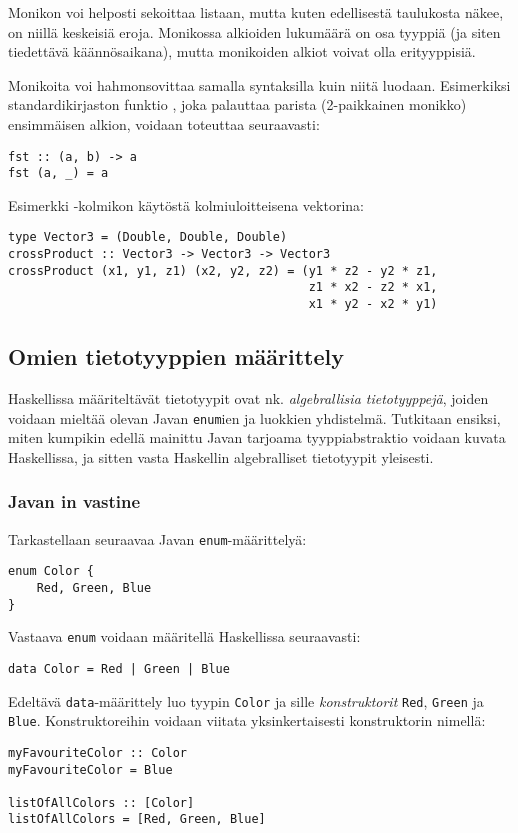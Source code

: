 Monikon voi helposti sekoittaa listaan,
mutta kuten edellisestä taulukosta näkee,
on niillä keskeisiä eroja.
Monikossa alkioiden lukumäärä on osa tyyppiä (ja siten tiedettävä käännösaikana),
mutta monikoiden alkiot voivat olla erityyppisiä.

Monikoita voi hahmonsovittaa samalla syntaksilla kuin niitä luodaan.
Esimerkiksi standardikirjaston funktio ,
joka palauttaa parista (2-paikkainen monikko) ensimmäisen alkion,
voidaan toteuttaa seuraavasti:
\begin{verbatim}
fst :: (a, b) -> a
fst (a, _) = a
\end{verbatim}
Esimerkki -kolmikon käytöstä kolmiuloitteisena vektorina:
\begin{verbatim}
type Vector3 = (Double, Double, Double)
crossProduct :: Vector3 -> Vector3 -> Vector3
crossProduct (x1, y1, z1) (x2, y2, z2) = (y1 * z2 - y2 * z1,
                                          z1 * x2 - z2 * x1,
                                          x1 * y2 - x2 * y1)
\end{verbatim}

\subsection{Omien tietotyyppien määrittely}
Haskellissa määriteltävät tietotyypit ovat nk. \emph{algebrallisia tietotyyppejä},
joiden voidaan mieltää olevan Javan \texttt{enum}ien ja luokkien yhdistelmä.
Tutkitaan ensiksi, miten kumpikin edellä mainittu Javan tarjoama tyyppiabstraktio
voidaan kuvata Haskellissa,
ja sitten vasta Haskellin algebralliset tietotyypit yleisesti.

\subsubsection{Javan in vastine}
Tarkastellaan seuraavaa Javan \texttt{enum}-määrittelyä:
\begin{verbatim}
enum Color {
    Red, Green, Blue
}
\end{verbatim}
Vastaava \texttt{enum} voidaan määritellä Haskellissa seuraavasti:
\begin{verbatim}
data Color = Red | Green | Blue
\end{verbatim}
Edeltävä \texttt{data}-määrittely luo tyypin \texttt{Color} ja sille \emph{konstruktorit} \texttt{Red}, \texttt{Green} ja \texttt{Blue}.
Konstruktoreihin voidaan viitata yksinkertaisesti konstruktorin nimellä:
\begin{verbatim}
myFavouriteColor :: Color
myFavouriteColor = Blue

listOfAllColors :: [Color]
listOfAllColors = [Red, Green, Blue]
\end{verbatim}

